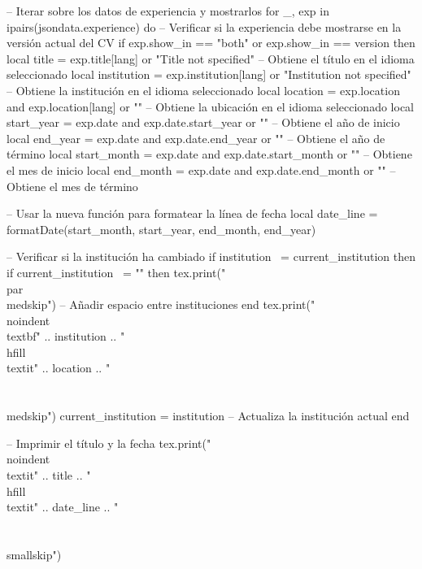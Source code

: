 \begin{luacode}
-- Iterar sobre los datos de experiencia y mostrarlos
for _, exp in ipairs(jsondata.experience) do
    -- Verificar si la experiencia debe mostrarse en la versión actual del CV
    if exp.show_in == "both" or exp.show_in == version then
        local title = exp.title[lang] or "Title not specified" -- Obtiene el título en el idioma seleccionado
        local institution = exp.institution[lang] or "Institution not specified" -- Obtiene la institución en el idioma seleccionado
        local location = exp.location and exp.location[lang] or "" -- Obtiene la ubicación en el idioma seleccionado
        local start_year = exp.date and exp.date.start_year or "" -- Obtiene el año de inicio
        local end_year = exp.date and exp.date.end_year or "" -- Obtiene el año de término
        local start_month = exp.date and exp.date.start_month or "" -- Obtiene el mes de inicio
        local end_month = exp.date and exp.date.end_month or "" -- Obtiene el mes de término

        -- Usar la nueva función para formatear la línea de fecha
        local date_line = formatDate(start_month, start_year, end_month, end_year)

        -- Verificar si la institución ha cambiado
        if institution ~= current_institution then
            if current_institution ~= "" then
                tex.print("\\par\\medskip") -- Añadir espacio entre instituciones
            end
            tex.print("\\noindent\\textbf{" .. institution .. "} \\hfill \\textit{" .. location .. "} \\\\ \\medskip")
            current_institution = institution -- Actualiza la institución actual
        end

        -- Imprimir el título y la fecha
        tex.print("\\noindent\\textit{" .. title .. "} \\hfill \\textit{" .. date_line .. "} \\\\ \\smallskip")


\end{luacode}
